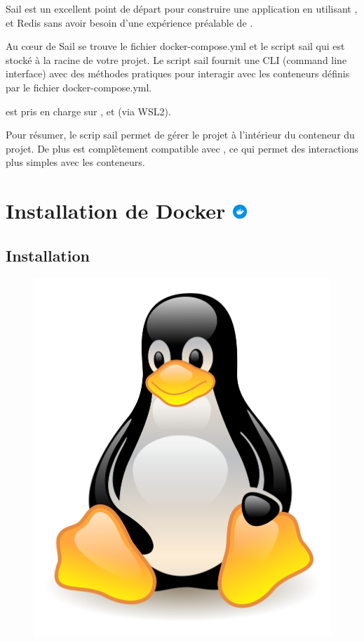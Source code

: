 \documentclass[internal]{nhitec_design}
\begin{document}
        Sail est un excellent point de départ pour construire une application \laravel{} en utilisant \php{}, \mysql et Redis sans avoir besoin d'une expérience préalable de \docker{}.

        Au cœur de Sail se trouve le fichier docker-compose.yml et le script sail qui est stocké à la racine de votre projet. Le script sail fournit une CLI (command line interface) avec des méthodes pratiques pour interagir avec les conteneurs \docker{} définis par le fichier docker-compose.yml.

        \laravelsail{} est pris en charge sur \macos{}, \linux{} et \windows{} (via WSL2).

        Pour résumer, le scrip sail permet de gérer le projet \laravel{} à l'intérieur du conteneur du projet. De plus \laravelsail{} est complètement compatible avec \docker{}, ce qui permet des interactions plus simples avec les conteneurs.

\section[Installation de Docker]{Installation de Docker \includegraphics[height=15pt]{figures-logos/docker.pdf}}
    \subsection[Installation Linux]{Installation \linux{}}

        \begin{figure}[h]
            \centering
            \includegraphics[scale=0.05]{Images_formation/LinuxLogo.png}
        \end{figure}
\end{document}
